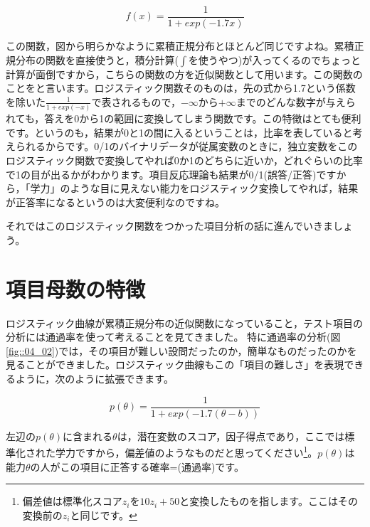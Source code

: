 \documentclass{ltjsbook}
\begin{document}
\[ f(x) = \frac{1}{1+exp(-1.7x)} \]

この関数，図から明らかなように累積正規分布とほとんど同じですよね。累積正規分布の関数を直接使うと，積分計算($\int$を使うやつ)が入ってくるのでちょっと計算が面倒ですから，こちらの関数の方を近似関数として用います。この関数のことをと言います。ロジスティック関数そのものは，先の式から1.7という係数を除いた$\frac{1}{1+exp(-x)}$で表されるもので，$-\infty$から$+\infty$までのどんな数字が与えられても，答えを0から1の範囲に変換してしまう関数です。この特徴はとても便利です。というのも，結果が0と1の間に入るということは，比率を表していると考えられるからです。0/1のバイナリデータが従属変数のときに，独立変数をこのロジスティック関数で変換してやれば0か1のどちらに近いか，どれぐらいの比率で1の目が出るかがわかります。項目反応理論も結果が0/1(誤答/正答)ですから，「学力」のような目に見えない能力をロジスティック変換してやれば，結果が正答率になるというのは大変便利なのですね。

それではこのロジスティック関数をつかった項目分析の話に進んでいきましょう。

\section{項目母数の特徴}
ロジスティック曲線が累積正規分布の近似関数になっていること，テスト項目の分析には通過率を使って考えることを見てきました。
特に通過率の分析(図\ref{fig::04_02})では，その項目が難しい設問だったのか，簡単なものだったのかを見ることができました。ロジスティック曲線もこの「項目の難しさ」を表現できるように，次のように拡張できます。

\[ p(\theta) = \frac{1}{1+exp(-1.7 (\theta - b))} \]

左辺の$p(\theta)$に含まれる$\theta$は，潜在変数のスコア，因子得点であり，ここでは標準化された学力ですから，偏差値のようなものだと思ってください\footnote{偏差値は標準化スコア$z_i$を$10z_i+50$と変換したものを指します。ここはその変換前の$z_i$と同じです。}。$p(\theta)$は能力$\theta$の人がこの項目に正答する確率=(通過率)です。
\end{document}
